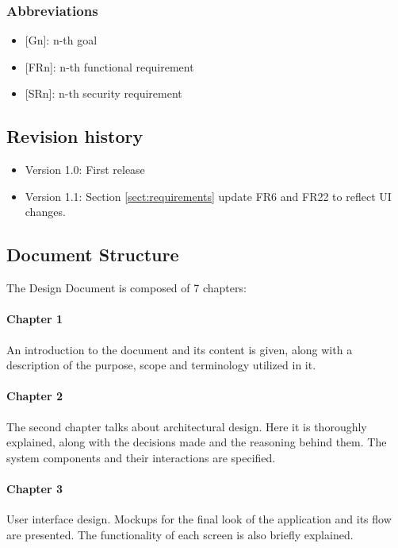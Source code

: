 \subsubsection{Abbreviations}

\begin{itemize}
    \item
    {[Gn]}: n-th goal
    \item
    {[FRn]}: n-th functional requirement
    \item
    {[SRn]}: n-th security requirement
\end{itemize}

\subsection{Revision history}

\begin{itemize}
    \item Version 1.0: First release
    \item Version 1.1: Section \ref{sect:requirements} update FR6 and FR22 to reflect UI changes.
\end{itemize}


\subsection{Document Structure}
The Design Document is composed of 7 chapters:

\paragraph{Chapter 1} An introduction to the document and its content is given, along with a description of the purpose, scope and terminology utilized in it.

\paragraph{Chapter 2} The second chapter talks about architectural design. Here it is thoroughly explained, along with the decisions made and the reasoning behind them. The system components and their interactions are specified.

\paragraph{Chapter 3} User interface design. Mockups for the final look of the application and its flow are presented. The functionality of each screen is also briefly explained.

